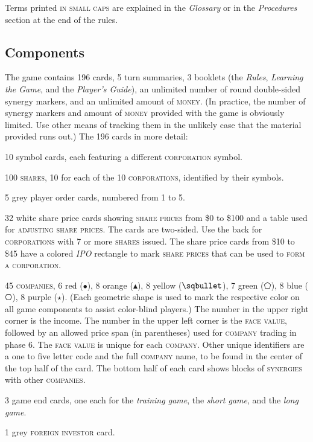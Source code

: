 \documentclass[11pt,a4paper]{article}
\newenvironment{my_itemize}
{\begin{list}{\labelitemi}{\leftmargin=1.2em}
  \setlength{\itemsep}{1pt}
  \setlength{\parskip}{0pt}
  \setlength{\parsep}{0pt}}
{\end{list}}
\begin{document}
\begin{multicols}{2}

{

  Terms printed \textsc{in small caps} are explained in the
  \emph{Glossary} or in the \emph{Procedures} section at the end of
  the rules.

\subsection*{Components}

The game contains 196 cards, 5 turn summaries, 3 booklets (the
\emph{Rules}, \emph{Learning the Game}, and the \emph{Player's
  Guide}), an unlimited number of round double-sided synergy markers,
and an unlimited amount of \textsc{money}. (In practice, the number of
synergy markers and amount of \textsc{money} provided with the game is
obviously limited. Use other means of tracking them in the unlikely
case that the material provided runs out.) The 196 cards in more
detail:
\begin{my_itemize}
\item 10 symbol cards, each featuring a different
  \textsc{corporation} symbol.
\item 100 \textsc{shares}, 10 for each of the 10
  \textsc{corporations}, identified by their symbols.
\item 5 grey player order cards, numbered from 1 to 5.
\item 32 white share price cards showing \textsc{share prices} from
  \$0 to \$100 and a table used for \textsc{adjusting share
    prices}. The cards are two-sided. Use the back for
  \textsc{corporations} with 7 or more \textsc{shares} issued. The
  share price cards from \$10 to \$45 have a colored \emph{IPO}
  rectangle to mark \textsc{share prices} that can be used to
  \textsc{form a corporation}.
\item 45 \textsc{companies}, 6 red ($\bullet$), 8 orange
  ($\blacktriangleup$), 8 yellow ($\sqbullet$), 7 green ($\pentagon$),
  8 blue ($\hexagon$), 8 purple ($\star$). (Each geometric shape is
  used to mark the respective color on all game components to assist
  color-blind players.) The number in the upper right corner is the
  income. The number in the upper left corner is the \textsc{face
    value}, followed by an allowed price span (in parentheses) used
  for \textsc{company} trading in phase 6. The \textsc{face value} is
  unique for each \textsc{company}. Other unique identifiers are a one
  to five letter code and the full \textsc{company} name, to be found
  in the center of the top half of the card. The bottom half of each
  card shows blocks of \textsc{synergies} with other
  \textsc{companies}.
\item 3 game end cards, one each for the \emph{training game}, the
  \emph{short game}, and the \emph{long game}.
\item 1 grey \textsc{foreign investor} card.
\end{my_itemize}

}
\end{multicols}
\end{document}

